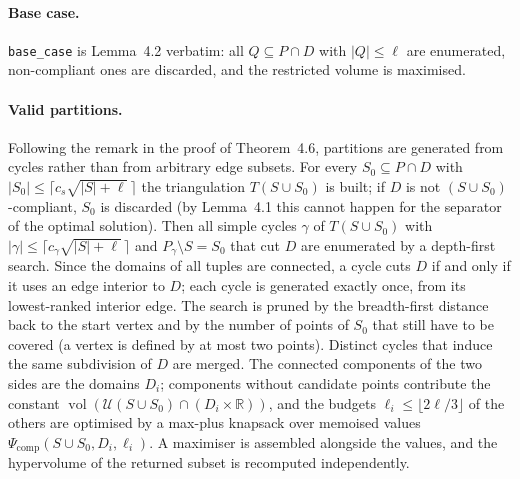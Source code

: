 \documentclass[12pt,a4paper]{article}
\newcommand{\vol}{\operatorname{vol}}
\newcommand{\U}{\mathcal{U}}
\newcommand{\R}{\mathbb{R}}
\newcommand{\Psic}{\Psi_{\mathrm{comp}}}
\newcommand{\code}[1]{\texttt{#1}}
\begin{document}
\paragraph{Base case.}
\code{base\_case} is Lemma~4.2 verbatim: all $Q\subseteq P\cap D$ with $|Q|\le\ell$ are
enumerated, non-compliant ones are discarded, and the restricted volume is maximised.

\paragraph{Valid partitions.}
Following the remark in the proof of Theorem~4.6, partitions are generated from cycles rather
than from arbitrary edge subsets.  For every $S_0\subseteq P\cap D$ with
$|S_0|\le\lceil c_{s}\sqrt{|S|+\ell}\,\rceil$ the triangulation $T(S\cup S_0)$ is built; if $D$ is
not $(S\cup S_0)$-compliant, $S_0$ is discarded (by Lemma~4.1 this cannot happen for the
separator of the optimal solution).  Then all simple cycles $\gamma$ of $T(S\cup S_0)$ with
$|\gamma|\le\lceil c_{\gamma}\sqrt{|S|+\ell}\,\rceil$ and $P_\gamma\setminus S=S_0$ that cut $D$
are enumerated by a depth-first search.  Since the domains of all tuples are connected, a cycle cuts $D$ if
and only if it uses an edge interior to $D$; each
cycle is generated exactly once, from its lowest-ranked interior edge.  The search is pruned by
the breadth-first distance back to the start vertex and by the number of points of $S_0$ that
still have to be covered (a vertex is defined by at most two points).  Distinct cycles that
induce the same subdivision of $D$ are merged.  The connected components of the two sides are
the domains $D_i$; components without candidate points contribute the constant
$\vol(\U(S\cup S_0)\cap(D_i\times\R))$, and the budgets $\ell_i\le\lfloor 2\ell/3\rfloor$ of the
others are optimised by a max-plus knapsack over memoised values $\Psic(S\cup S_0,D_i,\ell_i)$.
A maximiser is assembled alongside the values, and the hypervolume of the returned subset is
recomputed independently.
\end{document}
